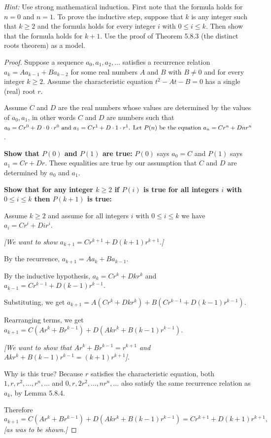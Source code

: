 \documentclass[14pt]{extarticle}
\begin{document}
{\it Hint:} Use strong mathematical induction. First note that the formula holds for \(n = 0\) and \(n = 1\). To 
prove the inductive step, suppose that $k$ is any integer such that \(k \geq 2\) and the formula holds for every 
integer $i$ with \(0 \leq i \leq k\). Then show that the formula holds for $k + 1$. Use the proof of Theorem 5.8.3 
(the distinct roots theorem) as a model.

\begin{proof}
Suppose a sequence \(a_0, a_1, a_2, \ldots\) satisfies a recurrence relation \(a_k = Aa_{k-1} + Ba_{k-2}\) for some 
real numbers $A$ and $B$ with \(B \neq 0\) and for every integer \(k \geq 2\). Assume the characteristic equation
\(t^2 - At - B = 0\) has a single (real) root $r$. 

Assume $C$ and $D$ are the real numbers whose values are 
determined by the values of $a_0, a_1$, in other words $C$ 
and $D$ are numbers such that \(a_0 = Cr^0 + D \cdot 0 \cdot r^0$ and $a_1 = Cr^1 + D \cdot 1 \cdot r^1$.

Let $P(n)$ be the equation \(a_n = Cr^n + Dnr^n\).

{\bf Show that $P(0)$ and $P(1)$ are true:} $P(0)$ says \(a_0 = C\) and $P(1)$ says \(a_1 = Cr + Dr\). These
equalities are true by our assumption that $C$ and $D$ are determined by $a_0$ and $a_1$.

{\bf Show that for any integer \(k \geq 2\) if $P(i)$ is true for all integers $i$ with \(0 \leq i \leq k\) then
$P(k+1)$ is true:} 

Assume \(k \geq 2\) and assume for all integers $i$ with \(0 \leq i \leq k\) we have \(a_i = Cr^i + Dir^i\).

{\it [We want to show \(a_{k+1} = Cr^{k+1} + D(k+1)r^{k+1}\).]}

By the recurrence, \(a_{k+1} = Aa_k + Ba_{k-1}\).

By the inductive hypothesis, \(a_k = Cr^k + Dkr^k\) and \(a_{k-1} = Cr^{k-1} + D(k-1)r^{k-1}\).

Substituting, we get \(a_{k+1} = A(Cr^k + Dkr^k) + B(Cr^{k-1} + D(k-1)r^{k-1})\).

Rearranging terms, we get \(a_{k+1} = C(Ar^k + Br^{k-1}) + D(Akr^k + B(k-1)r^{k-1})\).

{\it [We want to show that \(Ar^k + Br^{k-1} = r^{k+1}\) and \(Akr^k + B(k-1)r^{k-1} = (k+1)r^{k+1}\)]}.

Why is this true? Because $r$ satisfies the characteristic equation, both \(1, r, r^2, \ldots, r^n, \ldots\) and \(0, r, 2r^2, \ldots, nr^n, \ldots\) also satisfy the same recurrence relation as $a_k$, by Lemma 5.8.4.

Therefore
\[
a_{k+1} = C(Ar^k + Br^{k-1}) + D(Akr^k + B(k-1)r^{k-1}) = Cr^{k+1} + D(k+1)r^{k+1},
\]
{\it [as was to be shown.]}
\end{proof}
\end{document}
